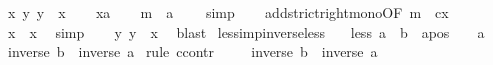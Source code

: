 \begin{isabellebody}
\ \ {\isachardoublequoteopen}{\isasymforall}\ x{\isachardot}{\kern0pt}\ {\isasymexists}y{\isachardot}{\kern0pt}\ y\ {\isachargreater}{\kern0pt}\ x{\isachardoublequoteclose}\isanewline
%
\isadelimproof
%
\endisadelimproof
%
\isatagproof
{}\isamarkupfalse%
\isanewline
\ \ \isamarkupfalse%
\ x{\isacharcolon}{\kern0pt}{\isacharcolon}{\kern0pt}{\isacharprime}{\kern0pt}a\isanewline
\ \ \isamarkupfalse%
\ m{}{\isacharcolon}{\kern0pt}\ {\isachardoublequoteopen}\ {\isacharparenleft}{\kern0pt}{}{\isacharcolon}{\kern0pt}{\isacharcolon}{\kern0pt}{\isacharprime}{\kern0pt}a{\isacharparenright}{\kern0pt}\ {\isachargreater}{\kern0pt}\ {}{\isachardoublequoteclose}\ \isamarkupfalse%
\ simp\isanewline
\ \ \isamarkupfalse%
\ add{\isacharunderscore}{\kern0pt}strict{\isacharunderscore}{\kern0pt}right{\isacharunderscore}{\kern0pt}mono{\isacharbrackleft}{\kern0pt}OF\ m{}{\isacharcomma}{\kern0pt}\ \ c{\isacharequal}{\kern0pt}x{\isacharbrackright}{\kern0pt}\isanewline
\ \ \isamarkupfalse%
\ {\isachardoublequoteopen}{}\ {\isacharplus}{\kern0pt}\ x\ {\isachargreater}{\kern0pt}\ x{\isachardoublequoteclose}\ \isamarkupfalse%
\ simp\isanewline
\ \ \isamarkupfalse%
\ {\isachardoublequoteopen}{\isasymexists}y{\isachardot}{\kern0pt}\ y\ {\isachargreater}{\kern0pt}\ x{\isachardoublequoteclose}\ \isamarkupfalse%
\ blast\isanewline
{}\isamarkupfalse%
%
\endisatagproof
{\isafoldproof}%
%
\isadelimproof
\isanewline
%
\endisadelimproof
\isanewline
{}\isamarkupfalse%
\ less{\isacharunderscore}{\kern0pt}imp{\isacharunderscore}{\kern0pt}inverse{\isacharunderscore}{\kern0pt}less{\isacharcolon}{\kern0pt}\isanewline
\ \ \ less{\isacharcolon}{\kern0pt}\ {\isachardoublequoteopen}a\ {\isacharless}{\kern0pt}\ b{\isachardoublequoteclose}\ \ apos{\isacharcolon}{\kern0pt}\ \ {\isachardoublequoteopen}{}\ {\isacharless}{\kern0pt}\ a{\isachardoublequoteclose}\isanewline
\ \ \ {\isachardoublequoteopen}inverse\ b\ {\isacharless}{\kern0pt}\ inverse\ a{\isachardoublequoteclose}\isanewline
%
\isadelimproof
%
\endisadelimproof
%
\isatagproof
{}\isamarkupfalse%
\ {\isacharparenleft}{\kern0pt}rule\ ccontr{\isacharparenright}{\kern0pt}\isanewline
\ \ \isamarkupfalse%
\ {\isachardoublequoteopen}{\isasymnot}\ inverse\ b\ {\isacharless}{\kern0pt}\ inverse\ a{\isachardoublequoteclose}\isanewline

\end{isabellebody}
